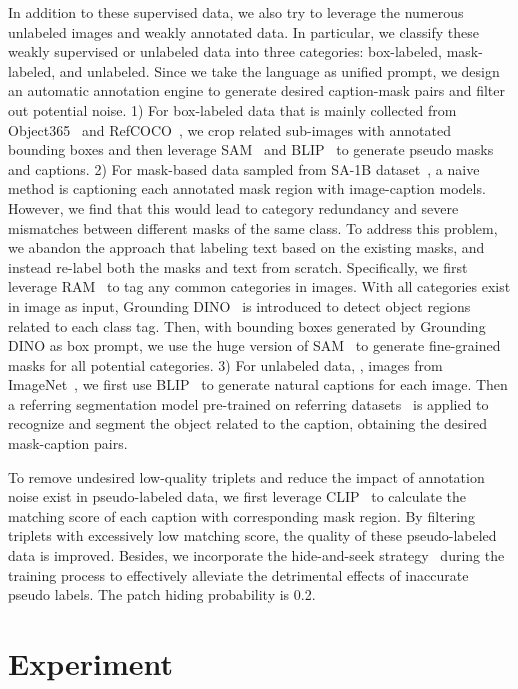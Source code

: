 \documentclass[10pt,twocolumn,letterpaper]{article}
\begin{document}
In addition to these supervised data, we also try to leverage the numerous unlabeled images and weakly annotated data. In particular, we classify these weakly supervised or unlabeled data into three categories: box-labeled, mask-labeled, and unlabeled. 
Since we take the language as unified prompt, we design an automatic annotation engine to generate desired caption-mask pairs and filter out potential noise.
1) For box-labeled data that is mainly collected from Object365~\cite{obj365} and RefCOCO~\cite{refcoco}, we crop related sub-images with annotated bounding boxes and then leverage SAM~\cite{sam} and BLIP~\cite{blip} to generate pseudo masks and captions.
2) For mask-based data sampled from SA-1B dataset~\cite{sam}, a naive method is captioning each annotated mask region with image-caption models. However, we find that this would lead to category redundancy and severe mismatches between different masks of the same class. 
To address this problem,  we abandon the approach that labeling text based on the existing masks, and instead re-label both the masks and text from scratch. Specifically, we first leverage RAM~\cite{ram} to tag any common categories in images. With all categories exist in image as input, Grounding DINO~\cite{groundingdino} is introduced to detect object regions related to each class tag. Then, with bounding boxes generated by Grounding DINO as box prompt, we use the huge version of SAM~\cite{sam} to generate fine-grained masks for all potential categories.
3) For unlabeled data, \eg, images from ImageNet~\cite{imagenet}, we first use BLIP~\cite{blip} to generate natural captions for each image.  Then a referring segmentation model pre-trained on referring datasets~\cite{refcoco} is applied to recognize and segment the object related to the caption, obtaining the desired mask-caption pairs.

To remove undesired low-quality triplets and reduce the impact of annotation noise exist in pseudo-labeled data, we first leverage CLIP~\cite{CLIP} to calculate the matching score of each caption with corresponding mask region. By filtering triplets with excessively low matching score, the quality of these pseudo-labeled data is improved. Besides, we incorporate the hide-and-seek strategy~\cite{kmn} during the training process to effectively alleviate the detrimental effects of inaccurate pseudo labels. The patch hiding probability is 0.2.





\section{Experiment}
\end{document}
